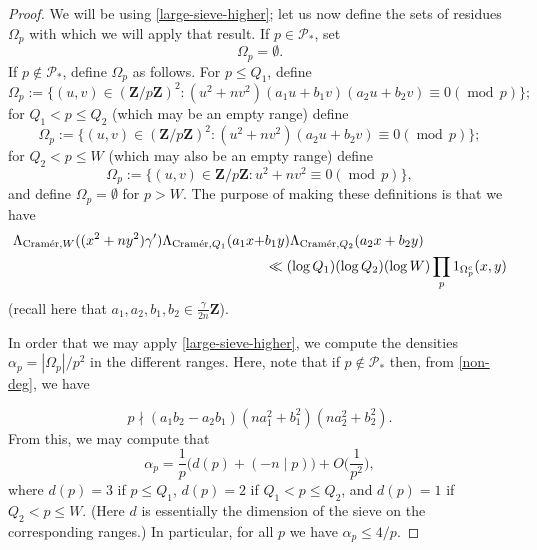 \documentclass[11pt,reqno]{amsart}
\numberwithin{equation}{section}
\theoremstyle{definition}
\theoremstyle{remark}
\newcommand{\mc}{\mathcal}
\renewcommand{\le}{\leqslant}
\newcommand\Z{\mathbf{Z}}
\newcommand{\legendre}[2]{(#1 \mid #2)}
\newcommand{\md}[1]{\ensuremath{(\operatorname{mod}\, #1)}}
\newcommand\cramer{{\textnormal{Cram\'er}}}
\begin{document}
\begin{proof}
We will be using \cref{large-sieve-higher}; let us now define the sets of residues $\Omega_p$ with which we will apply that result. If $p \in \mc{P}_*$, set
\[ \Omega_p = \emptyset.\] If $p \notin \mc{P}_*$, define $\Omega_p$ as follows.
For $p \le Q_1$, define 
\[ \Omega_p := \{ (u,v) \in (\Z/p\Z)^2 : (u^2 + nv^2)(a_1 u + b_1 v)(a_2 u + b_2 v) \equiv 0 \md{p}\};\]
for $Q_1 < p \le Q_2$ (which may be an empty range) define
\[ \Omega_p := \{ (u,v) \in (\Z/p\Z)^2 : (u^2 + nv^2)(a_2 u + b_2 v) \equiv 0 \md{p}\};\]
for $Q_2 < p \le W$ (which may also be an empty range) define
\[ \Omega_p := \{ (u,v) \in \Z/p\Z : u^2 + nv^2 \equiv 0 \md{p}\},\] and define $\Omega_p = \emptyset$ for $p > W$. The purpose of making these definitions is that we have 
\begin{align}\nonumber
\Lambda_{\cramer,W}((x^2 + ny^2)\gamma') \Lambda_{\cramer, Q_1}  (a_1 x + & b_1 y)\Lambda_{\cramer,Q_2}(a_2 x + b_2 y)  \\ & \ll (\log Q_1)(\log Q_2)(\log W) \prod_{p} 1_{\Omega_p^c}(x,y) \label{cramer-sieve}
\end{align}
(recall here that $a_1,a_2,b_1, b_2 \in \frac{\gamma}{2n} \Z$).


In order that we may apply \cref{large-sieve-higher}, we compute the densities $\alpha_p = |\Omega_p|/p^2$ in the different ranges. Here, note that if $p \notin \mc{P}_*$ then, from \cref{non-deg}, we have
 
 \begin{equation}\label{bad-moduli} p \nmid  (a_1 b_2 - a_2 b_1)(na_1^2 + b_1^2)(na_2^2 + b_2^2) .\end{equation} From this, we may compute that 
 \begin{equation}\label{density} \alpha_p = \frac{1}{p}\big(d(p) + \legendre{-n}{p}\big) + O\bigg(\frac{1}{p^2}\bigg),\end{equation}
 where $d(p) = 3$ if $p \le Q_1$, $d(p) = 2$ if $Q_1 < p \le Q_2$, and $d(p) = 1$ if $Q_2 < p \le W$. (Here $d$ is essentially the dimension of the sieve on the corresponding ranges.) 
 In particular, for all $p$ we have $\alpha_p \le 4/p$.


\end{proof}
\end{document}
